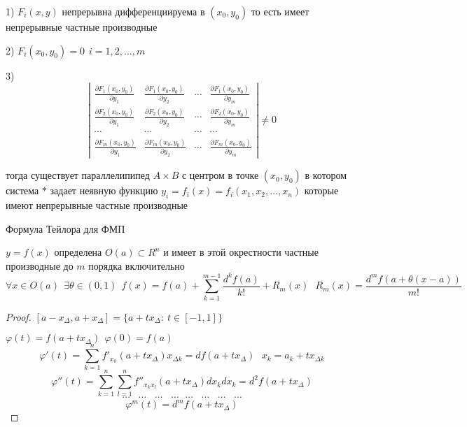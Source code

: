 \begin{theorem}
  1) $F_i(x, y)$ непрерывна дифференциируема в $(x_0, y_0)$ то есть имеет
  непрерывные частные производные

  2) $F_i(x_0, y_0) = 0 ~~ i = 1,2, \ldots, m$

  3)
  $$
  \left|
  \begin{array}{cccc}
    \frac{\partial F_1(x_0, y_0)}{\partial y_1} &
    \frac{\partial F_1(x_0, y_0)}{\partial y_2} &
    \cdots &
    \frac{\partial F_1(x_0, y_0)}{\partial y_m} \\

    \frac{\partial F_2(x_0, y_0)}{\partial y_1} &
    \frac{\partial F_2(x_0, y_0)}{\partial y_2} &
    \cdots &
    \frac{\partial F_2(x_0, y_0)}{\partial y_m} \\

    \cdots & \cdots &\cdots &\cdots \\

    \frac{\partial F_m(x_0, y_0)}{\partial y_1} &
    \frac{\partial F_m(x_0, y_0)}{\partial y_2} &
    \cdots &
    \frac{\partial F_m(x_0, y_0)}{\partial y_m}
  \end{array}
  \right| \not= 0
  $$

  тогда существует параллелипипед $A \times B$ с центром в точке $(x_0, y_0)$
  в котором система $*$ задает неявную функцию
  $y_i = f_i(x) = f_i(x_1, x_2, \ldots, x_n)$ которые имеют непрерывные частные
  производные
\end{theorem}

\begin{title}[\Large]
  Формула Тейлора для ФМП
\end{title}

\begin{theorem}
  $y = f(x)$ определена $O(a) \subset R^n$ и имеет в этой окрестности частные
  производные до $m$ порядка включительно
  $$
  \forall x \in O(a) ~~ \exists \theta \in (0, 1) ~~
  f(x) = f(a) + \sum_{k=1}^{m-1} \frac{d^k f(a)}{k!} + R_m(x) ~~~
  R_m(x) = \frac{d^m f(a + \theta(x-a))}{m!}
  $$
\end{theorem}

\begin{proof}
  $[a - x_{\Delta}, a + x_{\Delta}] = \{ a + tx_{\Delta}: ~ t \in [-1, 1] \}$

  $\varphi(t) = f(a + tx_{\Delta}) ~~ \varphi(0) = f(a)$
  $$
  \varphi'(t) = \sum_{k=1}^n f'_{x_k}(a + tx_{\Delta})x_{\Delta k} =
  df(a + tx_{\Delta}) ~~~ x_k = a_k + tx_{\Delta k}
  $$
  $$
  \varphi''(t) = \sum_{k=1}^n \sum_{l=1}^n f''_{x_k x_l}
  (a + tx_{\Delta})dx_k dx_k = d^2f(a + tx_{\Delta})
  $$
  $$
  \cdots ~~~~ \cdots ~~~~\cdots ~~~~\cdots ~~~ \cdots ~~~~ \cdots ~~~~
  \cdots ~~~~\cdots
  $$
  $$
  \varphi^m(t) = d^m f(a + tx_{\Delta})
  $$
\end{proof}


